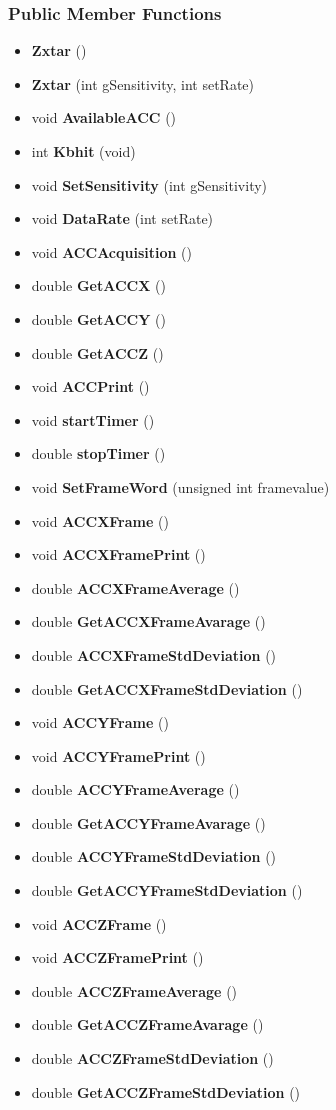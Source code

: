 \begin{appendices}
\subsubsection*{\-Public \-Member \-Functions}
\begin{itemize}
\item 
{\bf \-Zxtar} ()
\item 
{\bf \-Zxtar} (int g\-Sensitivity, int set\-Rate)
\item 
void {\bf \-Available\-A\-C\-C} ()
\item 
int {\bf \-Kbhit} (void)
\item 
void {\bf \-Set\-Sensitivity} (int g\-Sensitivity)
\item 
void {\bf \-Data\-Rate} (int set\-Rate)
\item 
void {\bf \-A\-C\-C\-Acquisition} ()
\item 
double {\bf \-Get\-A\-C\-C\-X} ()
\item 
double {\bf \-Get\-A\-C\-C\-Y} ()
\item 
double {\bf \-Get\-A\-C\-C\-Z} ()
\item 
void {\bf \-A\-C\-C\-Print} ()
\item 
void {\bf start\-Timer} ()
\item 
double {\bf stop\-Timer} ()
\item 
void {\bf \-Set\-Frame\-Word} (unsigned int framevalue)
\item 
void {\bf \-A\-C\-C\-X\-Frame} ()
\item 
void {\bf \-A\-C\-C\-X\-Frame\-Print} ()
\item 
double {\bf \-A\-C\-C\-X\-Frame\-Average} ()
\item 
double {\bf \-Get\-A\-C\-C\-X\-Frame\-Avarage} ()
\item 
double {\bf \-A\-C\-C\-X\-Frame\-Std\-Deviation} ()
\item 
double {\bf \-Get\-A\-C\-C\-X\-Frame\-Std\-Deviation} ()
\item 
void {\bf \-A\-C\-C\-Y\-Frame} ()
\item 
void {\bf \-A\-C\-C\-Y\-Frame\-Print} ()
\item 
double {\bf \-A\-C\-C\-Y\-Frame\-Average} ()
\item 
double {\bf \-Get\-A\-C\-C\-Y\-Frame\-Avarage} ()
\item 
double {\bf \-A\-C\-C\-Y\-Frame\-Std\-Deviation} ()
\item 
double {\bf \-Get\-A\-C\-C\-Y\-Frame\-Std\-Deviation} ()
\item 
void {\bf \-A\-C\-C\-Z\-Frame} ()
\item 
void {\bf \-A\-C\-C\-Z\-Frame\-Print} ()
\item 
double {\bf \-A\-C\-C\-Z\-Frame\-Average} ()
\item 
double {\bf \-Get\-A\-C\-C\-Z\-Frame\-Avarage} ()
\item 
double {\bf \-A\-C\-C\-Z\-Frame\-Std\-Deviation} ()
\item 
double {\bf \-Get\-A\-C\-C\-Z\-Frame\-Std\-Deviation} ()
\end{itemize}

\end{appendices}
